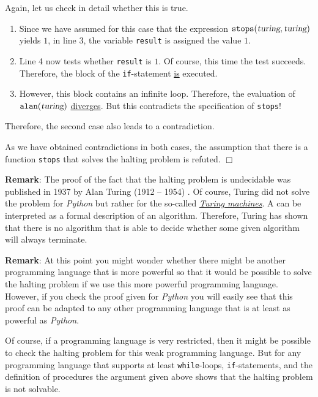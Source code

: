 \begin{enumerate}
      Again, let us check in detail whether this is true.  
      \begin{enumerate}
      \item Since we have assumed for this case that the expression 
            $\mathtt{stops}(\textsl{turing}, \textsl{turing})$ yields $1$, 
            in line 3, the variable \texttt{result} is assigned the value $1$. 
      \item Line 4 now tests whether \texttt{result} is $1$.  Of course,
            this time the test succeeds.  
            Therefore, the block of the \texttt{if}-statement \underline{is} executed.
      \item However, this block contains an infinite loop.  Therefore, the
            evaluation of $\mathtt{alan}(\textsl{turing})$ \underline{diver}g\underline{es}.
            But this contradicts the specification of \texttt{stops}!
      \end{enumerate}   
      Therefore, the second case also leads to a contradiction.
\end{enumerate}
As we have obtained contradictions in both cases, the assumption that there is a function
\texttt{stops} that solves the halting problem is refuted.
\hspace*{\fill} $\Box$
\vspace*{0.3cm}

\noindent
\textbf{Remark}:
The proof of the fact that the halting problem is undecidable was published in 1937 by Alan Turing (1912 -- 1954)
\cite{turing:1937}.  Of course, Turing did not solve the problem for \textsl{Python} but rather
for the so-called 
\href{https://en.wikipedia.org/wiki/Turing_machine}{\emph{Turing machines}}.  
A   
can be interpreted as a formal description of an algorithm.  
Therefore, Turing has shown that there is no algorithm that is able to decide whether some given
algorithm will always terminate.
\vspace*{0.3cm}

\noindent
\textbf{Remark}:
At this point you might wonder whether there might be another programming language
that is more powerful so that it would be possible to solve the halting problem if we use this more powerful
programming language.  However, if you check the proof given for \textsl{Python} you will easily
see that this proof can be adapted to any other programming language that is at least as powerful as
\textsl{Python}. \eox

Of course, if a programming language is very restricted, then it might be possible to check the
halting problem for this weak programming language.  But for any programming language that supports
at least \texttt{while}-loops, \texttt{if}-statements, and the definition of procedures the argument
given above shows that the halting problem is not solvable.

